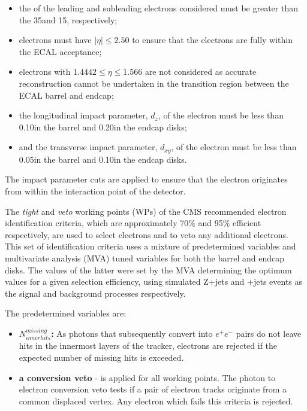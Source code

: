 \begin{itemize}
\item the \pt of the leading and subleading electrons considered must be greater than the 35\GeVc and 15\GeVc, respectively;
\item electrons must have $|\eta| \leq 2.50$ to ensure that the electrons are fully within the ECAL acceptance;
\item electrons with $1.4442 \leq \eta \leq 1.566$ are not considered as  accurate reconstruction cannot be undertaken in the transition region between the ECAL barrel and endcap;
\item the longitudinal impact parameter, $d_{z}$, of the electron must be less than 0.10\cm in the barrel and 0.20\cm in the endcap disks;
\item and the transverse impact parameter, $d_{xy}$, of the electron must be less than 0.05\cm in the barrel and 0.10\cm in the endcap disks.
\end{itemize}

The impact parameter cuts are applied to ensure that the electron originates from within the interaction point of the detector.

The \emph{tight} and \emph{veto} working points (WPs) of the CMS recommended electron identification criteria, which are approximately 70\% and 95\% efficient respectively, are used to select electrons and to veto any additional electrons.
This set of identification criteria uses a mixture of predetermined variables and multivariate analysis (MVA) tuned variables for both the barrel and endcap disks.
The values of the latter were set by the MVA determining the optimum values for a given selection efficiency, using simulated Z+jets and \ttbar+jets events as the signal and background processes respectively.

The predetermined variables are:
\begin{itemize}
\item \textbf{$N^{missing}_{inner hits}$:} As photons that subsequently convert into $e^{+} e^{-}$ pairs do not leave hits in the innermost layers of the tracker, electrons are rejected if the expected number of missing hits is exceeded.
\item \textbf{a conversion veto} - is applied for all working points. The photon to electron conversion veto tests if a pair of electron tracks originate from a common displaced vertex. Any electron which fails this criteria is rejected.
\end{itemize}


